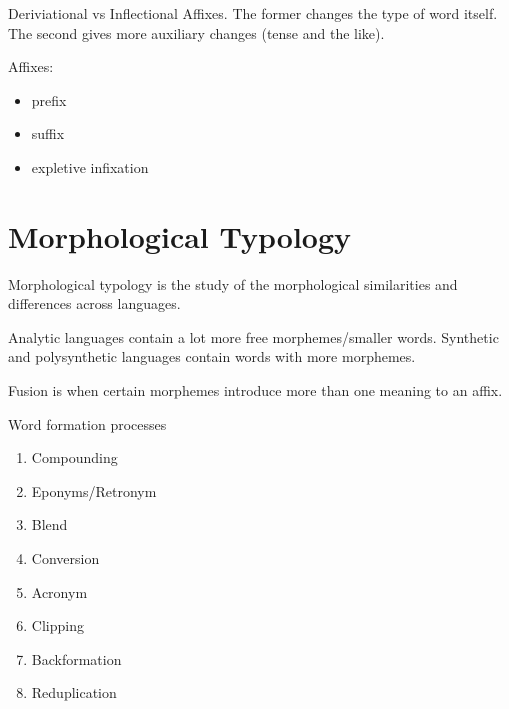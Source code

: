 \documentclass[12pt]{article}
\begin{document}
Deriviational vs Inflectional Affixes. The former changes the type of word itself. The second gives more auxiliary changes (tense and the like).

Affixes:
\begin{itemize}
\item prefix
\item suffix
\item expletive infixation
\end{itemize}

\section{Morphological Typology}

Morphological typology is the study of the morphological similarities and differences across languages.

Analytic languages contain a lot more free morphemes/smaller words. Synthetic and polysynthetic languages contain words with more morphemes.

Fusion is when certain morphemes introduce more than one meaning to an affix.

Word formation processes
\begin{enumerate}
\item Compounding
\item Eponyms/Retronym
\item Blend
\item Conversion
\item Acronym
\item Clipping
\item Backformation
\item Reduplication
\end{enumerate}
\end{document}
